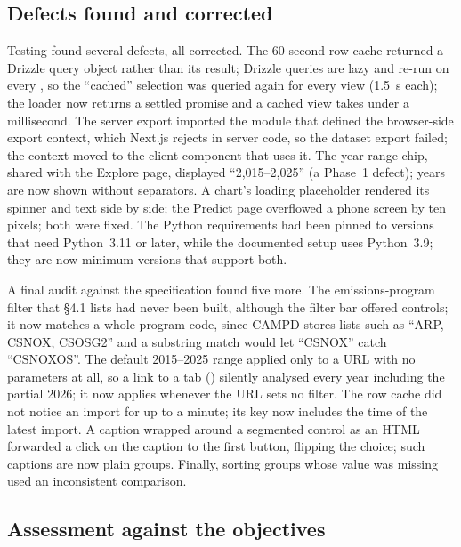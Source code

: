 \documentclass[11pt,a4paper]{article}
\begin{document}
\subsection{Defects found and corrected}

Testing found several defects, all corrected. The 60-second row cache returned a Drizzle query
object rather than its result; Drizzle queries are lazy and re-run on every , so the
``cached'' selection was queried again for every view (1.5~s each); the loader now returns a
settled promise and a cached view takes under a millisecond. The server export imported the
module that defined the browser-side export context, which Next.js rejects in server code, so
the dataset export failed; the context moved to the client component that uses it. The
year-range chip, shared with the Explore page, displayed ``2,015--2,025'' (a Phase~1 defect);
years are now shown without separators. A chart's loading placeholder rendered its spinner and
text side by side; the Predict page overflowed a phone screen by ten pixels; both were fixed.
The Python requirements had been pinned to versions that need Python~3.11 or later, while the
documented setup uses Python~3.9; they are now minimum versions that support both.

A final audit against the specification found five more. The emissions-program filter that
\S4.1 lists had never been built, although the filter bar offered controls; it now matches a
whole program code, since CAMPD stores lists such as ``ARP, CSNOX, CSOSG2'' and a substring match
would let ``CSNOX'' catch ``CSNOXOS''. The default 2015--2025 range applied only to a URL with no
parameters at all, so a link to a tab () silently analysed every year
including the partial 2026; it now applies whenever the URL sets no filter. The row cache did not
notice an import for up to a minute; its key now includes the time of the latest import. A
caption wrapped around a segmented control as an HTML  forwarded a click on the
caption to the first button, flipping the choice; such captions are now plain groups. Finally,
sorting groups whose value was missing used an inconsistent comparison.

\subsection{Assessment against the objectives}
\end{document}
